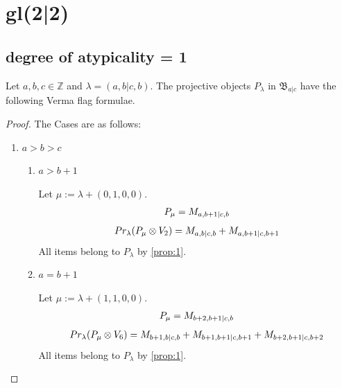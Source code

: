 
\section{gl(2|2)}
\subsection{degree of atypicality = 1}

\begin{theorem}
  Let $a,b,c \in \mathbb{Z}$ and $\lambda = (a,b|c,b)$. The projective objects $P_{\lambda}$ in $\mathfrak{B}_{a|c}$ have the following Verma flag formulae.
\end{theorem}
\begin{proof} The Cases are as follows:\par
\begin{enumerate}
  \item $a>b>c$
    \begin{enumerate}
      \item $a>b+1$ \par
      Let $\mu:=\lambda + (0,1,0,0) $. 
\begin{equation}\notag
  \begin{aligned}
      P_{\mu} = M_{a,b+1|c,b}
  \end{aligned}
\end{equation}
\begin{equation}\notag
  \begin{aligned}
    Pr_{\lambda}(P_\mu \otimes V_2) =
M_{a,b|c,b}
+M_{a,b+1|c,b+1}
  \end{aligned}
\end{equation}
All items belong to $P_\lambda$ by \cref{prop:1}.

      \item $a=b+1$ \par
      Let $\mu:=\lambda + (1,1,0,0) $. 
\begin{equation}\notag
  \begin{aligned}
      P_{\mu} =  M_{b+2,b+1|c,b}
  \end{aligned}
\end{equation}
\begin{equation}\notag
  \begin{aligned}
    Pr_{\lambda}(P_\mu \otimes V_6) =
    M_{b+1,b|c,b}
+M_{b+1,b+1|c,b+1}
+M_{b+2,b+1|c,b+2}
  \end{aligned}
\end{equation}
All items belong to $P_\lambda$ by \cref{prop:1}.
    \end{enumerate}


\end{enumerate}
\end{proof}
